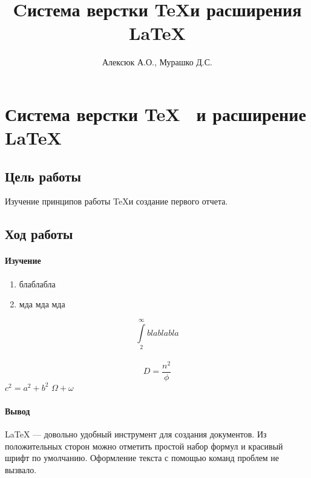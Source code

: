 \documentclass[10pt,a4paper]{article}
\author{Алексюк А.О., Мурашко Д.С.}
\title{Cистема верстки \TeX и расширения \LaTeX}
\begin{document}
\maketitle
\tableofcontents
\pagebreak
\section{Система верстки \TeX~ и расширение \LaTeX}
\subsection{Цель работы}
Изучение принципов работы \TeX и создание первого отчета.
\subsection{Ход работы}
\paragraph{Изучение}
\begin{enumerate}
\item блаблабла
\item мда мда мда
\end{enumerate}
$$\int\limits_2^{\infty} blablabla$$
\\
$$D = \frac{n^2}{\phi}$$
\hspace{10cm} $c^2=a^2+b^2$
$\Omega + 
\omega$
\paragraph{Вывод}
\LaTeX{} --- довольно удобный инструмент для создания документов. Из положительных сторон можно отметить простой набор формул и красивый шрифт по умолчанию. Оформление текста с помощью команд проблем не вызвало.
\end{document}
